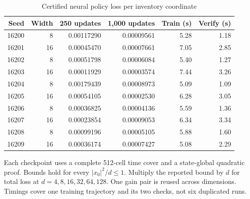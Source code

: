 \begin{table}[htbp]\centering\small
\caption{Certified neural policy loss per inventory coordinate}\label{tab:inventory}
\begin{tabular}{rrrrrr}
\toprule
Seed & Width & 250 updates & 1,000 updates & Train (s) & Verify (s)\\\midrule
16200 & 8 & 0.00117290 & 0.00009561 & 5.28 & 1.18\\
16201 & 16 & 0.00045470 & 0.00007661 & 7.05 & 2.85\\
16202 & 8 & 0.00051798 & 0.00006084 & 5.40 & 1.27\\
16203 & 16 & 0.00011929 & 0.00003574 & 7.44 & 3.26\\
16204 & 8 & 0.00179439 & 0.00008973 & 5.09 & 1.09\\
16205 & 16 & 0.00054105 & 0.00002530 & 6.28 & 3.05\\
16206 & 8 & 0.00036825 & 0.00004136 & 5.59 & 1.36\\
16207 & 16 & 0.00023854 & 0.00009053 & 6.34 & 3.34\\
16208 & 8 & 0.00099196 & 0.00005105 & 5.88 & 1.60\\
16209 & 16 & 0.00036174 & 0.00007427 & 5.08 & 2.29\\
\bottomrule\end{tabular}
\par\smallskip\footnotesize Each checkpoint uses a complete 512-cell time cover and a state-global quadratic proof. Bounds hold for every $|x_0|^2/d\leq1$. Multiply the reported bound by $d$ for total loss at $d=4,8,16,32,64,128$. One gain pair is reused across dimensions. Timings cover one training trajectory and its two checks, not six duplicated runs.
\end{table}
